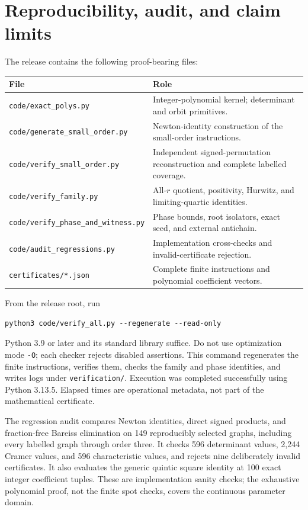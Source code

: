 \documentclass[11pt,a4paper]{article}
\theoremstyle{definition}\newtheorem{definition}[theorem]{Definition}
\theoremstyle{remark}\newtheorem{remark}[theorem]{Remark}
\newcommand{\code}[1]{\texttt{\small #1}}
\begin{document}
\section{Reproducibility, audit, and claim limits}\label{sec:repro}
The release contains the following proof-bearing files:
\begin{center}\small
\begin{tabular}{p{.45\linewidth}p{.47\linewidth}}\toprule
File & Role\\\midrule
\code{code/exact\_polys.py}&Integer-polynomial kernel; determinant and orbit primitives.\\
\code{code/generate\_small\_order.py}&Newton-identity construction of the small-order instructions.\\
\code{code/verify\_small\_order.py}&Independent signed-permutation reconstruction and complete labelled coverage.\\
\code{code/verify\_family.py}&All-$r$ quotient, positivity, Hurwitz, and limiting-quartic identities.\\
\code{code/verify\_phase\_and\_witness.py}&Phase bounds, root isolators, exact seed, and external antichain.\\
\code{code/audit\_regressions.py}&Implementation cross-checks and invalid-certificate rejection.\\
\code{certificates/*.json}&Complete finite instructions and polynomial coefficient vectors.\\\bottomrule
\end{tabular}
\end{center}
From the release root, run
\begin{verbatim}
python3 code/verify_all.py --regenerate --read-only
\end{verbatim}
Python 3.9 or later and its standard library suffice. Do not use optimization mode \code{-O}; each checker rejects disabled assertions. This command regenerates the finite instructions, verifies them, checks the family and phase identities, and writes logs under \code{verification/}. Execution was completed successfully using Python 3.13.5. Elapsed times are operational metadata, not part of the mathematical certificate.

The regression audit compares Newton identities, direct signed products, and fraction-free Bareiss elimination on 149 reproducibly selected graphs, including every labelled graph through order three. It checks 596 determinant values, 2,244 Cramer values, and 596 characteristic values, and rejects nine deliberately invalid certificates. It also evaluates the generic quintic square identity at 100 exact integer coefficient tuples. These are implementation sanity checks; the exhaustive polynomial proof, not the finite spot checks, covers the continuous parameter domain.
\end{document}
